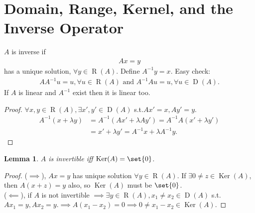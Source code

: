 \documentclass[a4paper]{book}
\newtheorem{lemma}[thm]{Lemma}
\DeclarePairedDelimiter{\set}\lbrace\rbrace
\DeclareMathOperator{\Ker}{Ker}
\DeclareMathOperator{\domain}{D}
\DeclareMathOperator{\range}{R}
\begin{document}
\section{Domain, Range, Kernel, and the Inverse Operator}
\begin{myDef}[inverse]
    $A$ is inverse if
    \begin{gather*}
        Ax = y
    \end{gather*}
    has a unique solution, $\forall y \in \range(A)$. Define $A^{-1}y=x$. Easy check:
    \begin{gather*}
        AA^{-1}u=u, \forall u \in \range(A) \text{ and } A^{-1}Au=u, \forall u \in \domain(A).
    \end{gather*}
    If $A$ is linear and $A^{-1}$ exist then it is linear too.    
\end{myDef}
\begin{proof}
    $\forall x,y \in \range(A), \exists x', y' \in \domain(A)$ s.t.$Ax'=x, Ay'=y$.
    \begin{align*}
        A^{-1}(x+\lambda y)&=A^{-1}(Ax'+\lambda Ay')=A^{-1}A(x'+\lambda y') \\
        &=x'+\lambda y'=A^{-1}x+\lambda A^{-1}y.
    \end{align*}
\end{proof}
\begin{lemma}
    $A$ is invertible iff $\Ker (A) = \set{0}$.
\end{lemma}
\begin{proof}
    ($\implies$), $Ax=y$ has unique solution $\forall y \in \range(A)$.
    If $\exists 0 \neq z \in \Ker(A)$, then $A(x+z)=y$ also, so $\Ker(A)$ must be $\set{0}$.\\
    ($\impliedby$), if $A$ is not invertible 
    $\implies \exists y \in \range(A), x_1 \neq x_2 \in \domain(A)$ s.t.
    $Ax_1=y, Ax_2=y. \implies A(x_1-x_2)=0 \implies 0 \neq x_1-x_2 \in \Ker(A)$. 
\end{proof}
\end{document}

